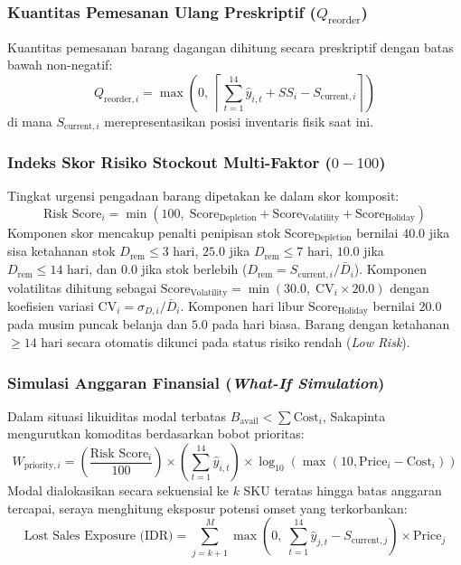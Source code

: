 \documentclass[12pt,a4paper]{article}
\begin{document}
\subsubsection{Kuantitas Pemesanan Ulang Preskriptif (\texorpdfstring{$Q_{\text{reorder}}$}{Q\_reorder})}
Kuantitas pemesanan barang dagangan dihitung secara preskriptif dengan batas bawah non-negatif:
\begin{equation}
    Q_{\text{reorder}, i} = \max\left(0, \; \left\lceil \sum_{t=1}^{14} \hat{y}_{i, t} + SS_i - S_{\text{current}, i} \right\rceil\right)
\end{equation}
di mana $S_{\text{current}, i}$ merepresentasikan posisi inventaris fisik saat ini.

\subsubsection{Indeks Skor Risiko Stockout Multi-Faktor (\texorpdfstring{$0 - 100$}{0-100})}
Tingkat urgensi pengadaan barang dipetakan ke dalam skor komposit:
\begin{equation}
    \text{Risk Score}_i = \min\left(100, \; \text{Score}_{\text{Depletion}} + \text{Score}_{\text{Volatility}} + \text{Score}_{\text{Holiday}}\right)
\end{equation}
Komponen skor mencakup penalti penipisan stok $\text{Score}_{\text{Depletion}}$ bernilai $40.0$ jika sisa ketahanan stok $D_{\text{rem}} \le 3\text{ hari}$, $25.0$ jika $D_{\text{rem}} \le 7\text{ hari}$, $10.0$ jika $D_{\text{rem}} \le 14\text{ hari}$, dan $0.0$ jika stok berlebih ($D_{\text{rem}} = S_{\text{current}, i} / \bar{D}_i$). Komponen volatilitas dihitung sebagai $\text{Score}_{\text{Volatility}} = \min(30.0, \; \text{CV}_i \times 20.0)$ dengan koefisien variasi $\text{CV}_i = \sigma_{D, i} / \bar{D}_i$. Komponen hari libur $\text{Score}_{\text{Holiday}}$ bernilai $20.0$ pada musim puncak belanja dan $5.0$ pada hari biasa. Barang dengan ketahanan $\ge 14\text{ hari}$ secara otomatis dikunci pada status risiko rendah (\textit{Low Risk}).

\subsubsection{Simulasi Anggaran Finansial (\textit{What-If Simulation})}
Dalam situasi likuiditas modal terbatas $B_{\text{avail}} < \sum \text{Cost}_i$, Sakapinta mengurutkan komoditas berdasarkan bobot prioritas:
\begin{equation}
    W_{\text{priority}, i} = \left(\frac{\text{Risk Score}_i}{100}\right) \times \left(\sum_{t=1}^{14}\hat{y}_{i, t}\right) \times \log_{10}(\max(10, \text{Price}_i - \text{Cost}_i))
\end{equation}
Modal dialokasikan secara sekuensial ke $k$ SKU teratas hingga batas anggaran tercapai, seraya menghitung eksposur potensi omset yang terkorbankan:
\begin{equation}
    \text{Lost Sales Exposure (IDR)} = \sum_{j=k+1}^{M} \max\left(0, \; \sum_{t=1}^{14}\hat{y}_{j, t} - S_{\text{current}, j}\right) \times \text{Price}_j
\end{equation}
\end{document}

